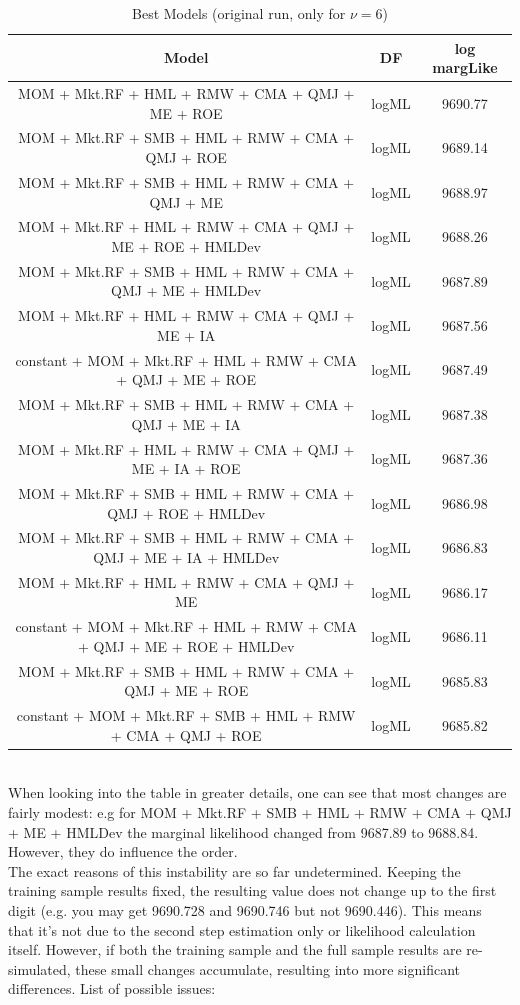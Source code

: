 \documentclass[12pt]{article}
\begin{document}
\begin{table}[!ht]
	\centering
	\footnotesize
	\begin{tabular}{ccc}
		\hline
		Model & DF & log margLike \\ 
	 \hline
	 MOM + Mkt.RF + HML + RMW + CMA + QMJ + ME + ROE & logML & 9690.77 \\ 
	 MOM + Mkt.RF + SMB + HML + RMW + CMA + QMJ + ROE & logML & 9689.14 \\ 
	 MOM + Mkt.RF + SMB + HML + RMW + CMA + QMJ + ME & logML & 9688.97 \\ 
	 MOM + Mkt.RF + HML + RMW + CMA + QMJ + ME + ROE + HMLDev & logML & 9688.26 \\ 
	 MOM + Mkt.RF + SMB + HML + RMW + CMA + QMJ + ME + HMLDev & logML & 9687.89 \\ 
	 MOM + Mkt.RF + HML + RMW + CMA + QMJ + ME + IA & logML & 9687.56 \\ 
	 constant + MOM + Mkt.RF + HML + RMW + CMA + QMJ + ME + ROE & logML & 9687.49 \\ 
	 MOM + Mkt.RF + SMB + HML + RMW + CMA + QMJ + ME + IA & logML & 9687.38 \\ 
	 MOM + Mkt.RF + HML + RMW + CMA + QMJ + ME + IA + ROE & logML & 9687.36 \\ 
	 MOM + Mkt.RF + SMB + HML + RMW + CMA + QMJ + ROE + HMLDev & logML & 9686.98 \\ 
	 MOM + Mkt.RF + SMB + HML + RMW + CMA + QMJ + ME + IA + HMLDev & logML & 9686.83 \\ 
	 MOM + Mkt.RF + HML + RMW + CMA + QMJ + ME & logML & 9686.17 \\ 
	 constant + MOM + Mkt.RF + HML + RMW + CMA + QMJ + ME + ROE + HMLDev & logML & 9686.11 \\ 
	 MOM + Mkt.RF + SMB + HML + RMW + CMA + QMJ + ME + ROE & logML & 9685.83 \\ 
	 constant + MOM + Mkt.RF + SMB + HML + RMW + CMA + QMJ + ROE & logML & 9685.82 \\ 
	 \hline
	\end{tabular}
		\caption{Best Models (original run, only for $\nu = 6$)}
\end{table} \\
When looking into the table in greater details, one can see that most changes are fairly modest: e.g for MOM + Mkt.RF + SMB + HML + RMW + CMA + QMJ + ME + HMLDev the marginal likelihood changed from 9687.89 to 9688.84. However, they do influence the order.\\
The exact reasons of this instability are so far undetermined. Keeping the training sample results fixed, the resulting value does not change up to the first digit (e.g. you may get 9690.728 and 9690.746 but not 9690.446). This means that it's not due to the second step estimation only or likelihood calculation itself. However, if both the training sample and the full sample results are re-simulated, these small changes accumulate, resulting into more significant differences. List of possible issues:
\end{document}
